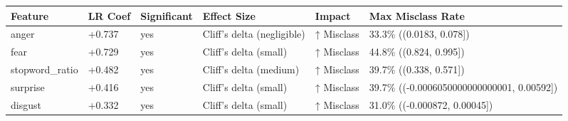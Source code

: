 \begin{tabular}{llllll}
\toprule
Feature & LR Coef & Significant & Effect Size & Impact & Max Misclass Rate \\
\midrule
anger & +0.737 & yes & Cliff's delta (negligible) & ↑ Misclass & 33.3\% ((0.0183, 0.078]) \\
fear & +0.729 & yes & Cliff's delta (small) & ↑ Misclass & 44.8\% ((0.824, 0.995]) \\
stopword\_ratio & +0.482 & yes & Cliff's delta (medium) & ↑ Misclass & 39.7\% ((0.338, 0.571]) \\
surprise & +0.416 & yes & Cliff's delta (small) & ↑ Misclass & 39.7\% ((-0.0006050000000000001, 0.00592]) \\
disgust & +0.332 & yes & Cliff's delta (small) & ↑ Misclass & 31.0\% ((-0.000872, 0.00045]) \\
\bottomrule
\end{tabular}
